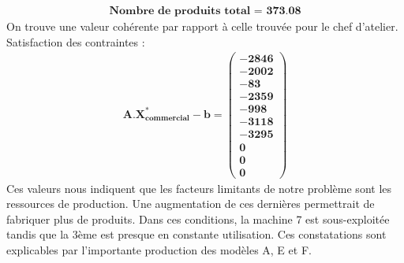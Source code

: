 \documentclass[12pt]{article}
\begin{document}
\begin{align*}
\textbf{Nombre de produits total = 373.08}
\end{align*}
On trouve une valeur cohérente par rapport à celle trouvée pour le chef d'atelier.\\
Satisfaction des contraintes : 
\begin{align*}
\boldsymbol{A.X^{*}_{commercial} - b = 
   \left (
   \begin{aligned}
      -2846 \\
      -2002 \\
      -83 \\
      -2359 \\
      -998 \\
      -3118 \\
      -3295 \\
      0 \\
      0 \\
      0
   \end{aligned}
   \right )
 } 
\end{align*}
Ces valeurs nous indiquent que les facteurs limitants de notre problème sont les ressources de production. Une augmentation de ces dernières permettrait de fabriquer plus de produits.
Dans ces conditions, la machine 7 est sous-exploitée tandis que la 3ème est presque en constante utilisation. Ces constatations sont explicables par l'importante production des modèles A, E et F. 
\end{document}

